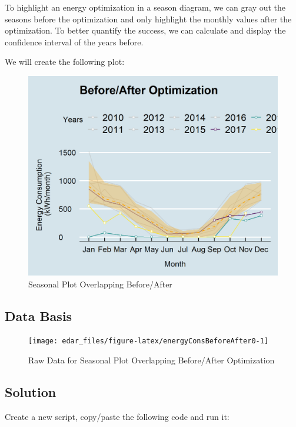 \documentclass[
  a4paperpaper,
]{book}
\begin{document}
To highlight an energy optimization in a season diagram, we can gray out the seasons before the optimization and only highlight the monthly values after the optimization. To better quantify the success, we can calculate and display the confidence interval of the years before.

We will create the following plot:

\begin{figure}
\includegraphics[width=0.7\linewidth]{images/plotEnergyConsBeforeAfter} \caption{Seasonal Plot Overlapping Before/After}\label{fig:unnamed-chunk-12}
\end{figure}

\hypertarget{data-basis-3}{%
\subsection{Data Basis}\label{data-basis-3}}

\begin{figure}
\texttt{[image: edar\_files/figure-latex/energyConsBeforeAfter0-1]} \caption{Raw Data for Seasonal Plot Overlapping Before/After Optimization}\label{fig:energyConsBeforeAfter0}
\end{figure}

\newpage

\hypertarget{solution-3}{%
\subsection{Solution}\label{solution-3}}

Create a new script, copy/paste the following code and run it:
\end{document}
